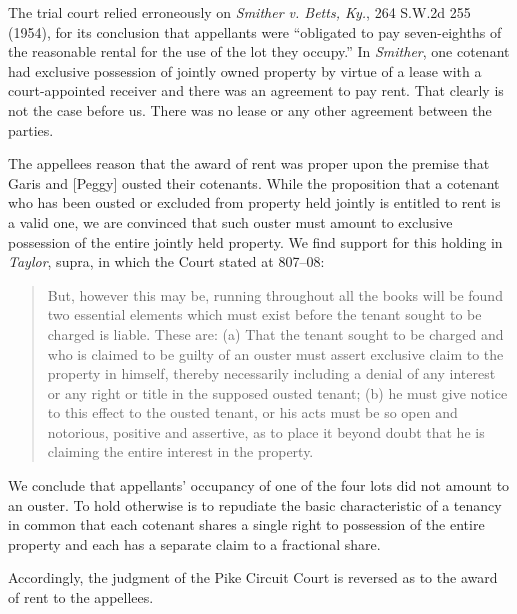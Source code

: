 The trial court relied erroneously on \emph{Smither v. Betts, Ky.}, 264 S.W.2d
255 (1954), for its conclusion that appellants were ``obligated to pay
seven-eighths of the reasonable rental for the use of the lot they occupy.'' In
\textit{Smither}, one cotenant had exclusive possession of jointly owned
property by virtue of a lease with a court-appointed receiver and there was an
agreement to pay rent. That clearly is not the case before us. There was no
lease or any other agreement between the parties.

The appellees reason that the award of rent was proper upon the premise that
Garis and [Peggy] ousted their cotenants. While the proposition that a cotenant
who has been ousted or excluded from property held jointly is entitled to rent
is a valid one, we are convinced that such ouster must amount to exclusive
possession of the entire jointly held property. We find support for this
holding in \emph{Taylor}, supra, in which the Court stated at 807--08:
\begin{quote}
But, however this may be, running throughout all the books will be found two
essential elements which must exist before the tenant sought to be charged is
liable. These are: (a) That the tenant sought to be charged and who is claimed
to be guilty of an ouster must assert exclusive claim to the property in
himself, thereby necessarily including a denial of any interest or any right or
title in the supposed ousted tenant; (b) he must give notice to this effect to
the ousted tenant, or his acts must be so open and notorious, positive and
assertive, as to place it beyond doubt that he is claiming the entire interest
in the property.
\end{quote}
We conclude that appellants' occupancy of one of the four lots did not amount to
an ouster. To hold otherwise is to repudiate the basic characteristic of a
tenancy in common that each cotenant shares a single right to possession of the
entire property and each has a separate claim to a fractional share.

Accordingly, the judgment of the Pike Circuit Court is reversed as to the award
of rent to the appellees.

